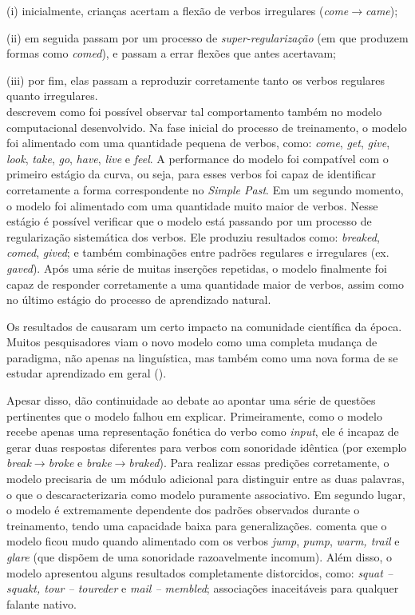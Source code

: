 (i) inicialmente, crianças acertam a flexão de verbos irregulares (\textit{come}$\rightarrow$\textit{came});

(ii) em seguida passam por um processo de \textit{super-regularização} (em que produzem formas como \textit{comed}), e passam a errar flexões que antes acertavam;

(iii) por fim, elas passam a reproduzir corretamente tanto os verbos regulares quanto irregulares. \\


\cite{rumelhart:1986} descrevem como foi possível observar tal comportamento também no modelo computacional desenvolvido.
Na fase inicial do processo de treinamento, o modelo foi alimentado com uma quantidade pequena de verbos, como: \textit{come}, \textit{get}, \textit{give}, \textit{look}, \textit{take}, \textit{go}, \textit{have}, \textit{live} e \textit{feel}. A performance do modelo foi compatível com o primeiro estágio da curva, ou seja, para esses verbos foi capaz de identificar corretamente a forma correspondente no \textit{Simple Past}. Em um segundo momento, o modelo foi alimentado com uma quantidade muito maior de verbos. Nesse estágio é possível verificar que o modelo está passando por um processo de regularização sistemática dos verbos. Ele produziu resultados como: \textit{breaked}, \textit{comed}, \textit{gived}; e também combinações entre padrões regulares e irregulares (ex. \textit{gaved}). 
Após uma série de muitas inserções repetidas, o modelo finalmente foi capaz de responder corretamente a uma quantidade maior de verbos, assim como no último estágio do processo de aprendizado natural. 

Os resultados de \cite{rumelhart:1986} causaram um certo impacto na comunidade científica da época. Muitos pesquisadores viam o novo modelo como uma completa mudança de paradigma, não apenas na linguística, mas também como uma nova forma de se estudar aprendizado em geral (\cite{Schneider1987}). 

Apesar disso, \cite{Pinker:1988} dão continuidade ao debate ao apontar uma série de questões pertinentes que o modelo falhou em explicar. Primeiramente, como o modelo recebe apenas uma representação fonética do verbo como \textit{input}, ele é incapaz de gerar duas respostas diferentes para verbos com sonoridade idêntica (por exemplo \textit{break}$\rightarrow$\textit{broke} e \textit{brake}$\rightarrow$\textit{braked}). Para realizar essas predições corretamente, o modelo precisaria de um módulo adicional para distinguir entre as duas palavras, o que o descaracterizaria como modelo puramente associativo. Em segundo lugar, o modelo é extremamente dependente dos padrões observados durante o treinamento, tendo uma capacidade baixa para generalizações. \cite{Pinker:1999} comenta que o modelo ficou mudo quando alimentado com os verbos \textit{jump}, \textit{pump}, \textit{warm, trail} e \textit{glare} (que dispõem de uma sonoridade razoavelmente incomum). Além disso, o modelo apresentou alguns resultados completamente distorcidos, como: \textit{squat – squakt, tour – toureder} e \textit{mail – membled}; associações inaceitáveis para qualquer falante nativo. 

